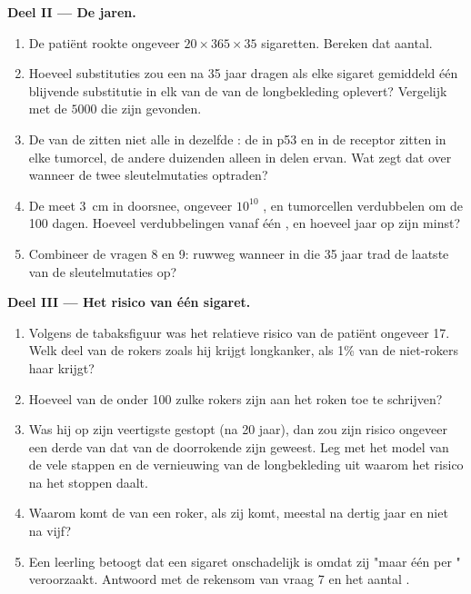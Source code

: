 \begin{problem}
\medskip
\noindent\textbf{Deel II --- De jaren.}
\begin{enumerate}[resume]
  \item De patiënt rookte ongeveer $20 \times 365 \times 35$ sigaretten.
        Bereken dat aantal.
  \item Hoeveel substituties zou een  na 35 jaar dragen als elke
        sigaret gemiddeld één blijvende substitutie in elk van de 
        van de longbekleding oplevert? Vergelijk met de $\num{5000}$ die
        zijn gevonden.
  \item De  van de  zitten niet alle in dezelfde : de
         in p53 en in de receptor zitten in elke tumorcel, de
        andere duizenden alleen in delen ervan. Wat zegt dat over wanneer
        de twee sleutelmutaties optraden?
  \item De  meet \qty{3}{cm} in doorsnee, ongeveer $10^{10}$ ,
        en tumorcellen verdubbelen om de 100 dagen. Hoeveel verdubbelingen
        vanaf één , en hoeveel jaar op zijn minst?
  \item Combineer de vragen 8 en 9: ruwweg wanneer in die 35 jaar trad de
        laatste van de sleutelmutaties op?
\end{enumerate}

\medskip
\noindent\textbf{Deel III --- Het risico van één sigaret.}
\begin{enumerate}[resume]
  \item Volgens de tabaksfiguur was het relatieve risico van de patiënt
        ongeveer 17. Welk deel van de rokers zoals hij krijgt longkanker,
        als 1\% van de niet-rokers haar krijgt?
  \item Hoeveel van de  onder 100 zulke rokers zijn aan het roken
        toe te schrijven?
  \item Was hij op zijn veertigste gestopt (na 20 jaar), dan zou zijn
        risico ongeveer een derde van dat van de doorrokende zijn
        geweest. Leg met het model van de vele stappen en de vernieuwing
        van de longbekleding uit waarom het risico na het stoppen daalt.
  \item Waarom komt de  van een roker, als zij komt, meestal na
        dertig jaar en niet na vijf?
  \item Een leerling betoogt dat een sigaret onschadelijk is omdat zij
        "maar één  per " veroorzaakt. Antwoord met de
        rekensom van vraag 7 en het aantal .
\end{enumerate}


\end{problem}
